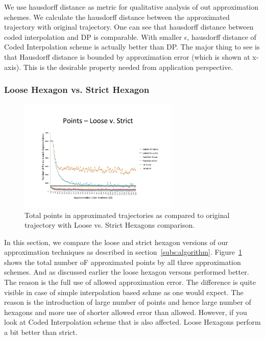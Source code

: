 \documentclass[conference]{IEEEtran}
\begin{document}
We use hausdorff distance as metric for qualitative analysis of out approximation schemes. We calculate the hausdorff 
distance between the approximated trajectory with original trajectory. One can see that hausdorff distance between coded 
interpolation and DP is comparable. With smaller $\epsilon$, hausdorff distance of Coded Interpolation scheme is actually 
better than DP. The major thing to see is that Hausdorff distance is bounded by approximation error (which is shown at x-axis). 
This is the desirable property needed from application perspective.

\subsubsection{Loose Hexagon vs. Strict Hexagon}

\begin{figure}[h]
  \centering
  \includegraphics[width=3in]{images/total-points-loose-v-strict.pdf}
  \caption {Total points in approximated trajectories as compared to original trajectory with Loose vs. Strict Hexagons comparison.}
  \label{fig:total-points-loose-strict}
  \end{figure}
  
In this section, we compare the loose and strict hexagon versions of our approximation techniques as described in section~\ref{subs:algorithm}. 
Figure~\ref{fig:total-points-loose-strict} shows the total number oF approximated points by all three approximation schemes. And as 
discussed earlier the loose hexagon versons performed better. The reason is the full use of allowed approximation error. The 
difference is quite visible in case of simple interpolation based schme as one would expect. The reason is the introduction of large 
number of points and hence large number of hexagons and more use of shorter allowed error than allowed. However, if you look at 
Coded Interpolation scheme that is also affected. Loose Hexagons perform a bit better than strict.
  
\end{document}
